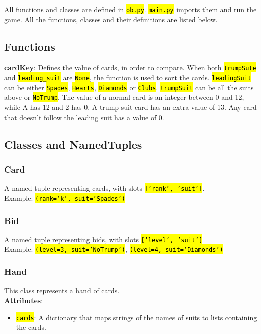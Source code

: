\documentclass[12pt]{article}
\newcommand{\code}[1]{\texttt{\hl{#1}}}
\begin{document}
All functions and classes are defined in \code{ob.py}. \code{main.py} imports
them and run the game. All the functions, classes and their definitions are
listed below.

\subsection{Functions}%
\label{sub:functions}

\noindent \textbf{cardKey}: Defines the value of cards, in order to compare.
When both \code{trumpSute} and \code{leading\_suit} are \code{None}, the function
is used to sort the cards. \code{leadingSuit} can be either \code{Spades},
\code{Hearts}, \code{Diamonds} or \code{Clubs}. \code{trumpSuit} can be all the 
suits above or \code{NoTrump}. The value of a normal card is an integer between
0 and 12, while A has 12 and 2 has 0. A trump suit card has an extra value of
13. Any card that doesn't follow the leading suit has a value of 0.

\subsection{Classes and NamedTuples}%
\label{sub:classes}

\subsubsection{Card}%
\label{ssub:card}
A named tuple representing cards, with slots \code{['rank', 'suit']}.\\
Example: \code{(rank='k', suit='Spades')}

\subsubsection{Bid}%
\label{ssub:bid}
A named tuple representing bids, with slots \code{['level', 'suit']}\\
Example: \code{(level=3, suit='NoTrump')}, \code{(level=4, suit='Diamonds')}


\subsubsection{Hand}%
\label{ssub:hand}

This class represents a hand of cards.\\

\textbf{Attributes}:\\
\begin{itemize}
\item \code{cards}: A dictionary that maps strings of the names of suits to lists
containing the cards.
\end{itemize}
\end{document}
